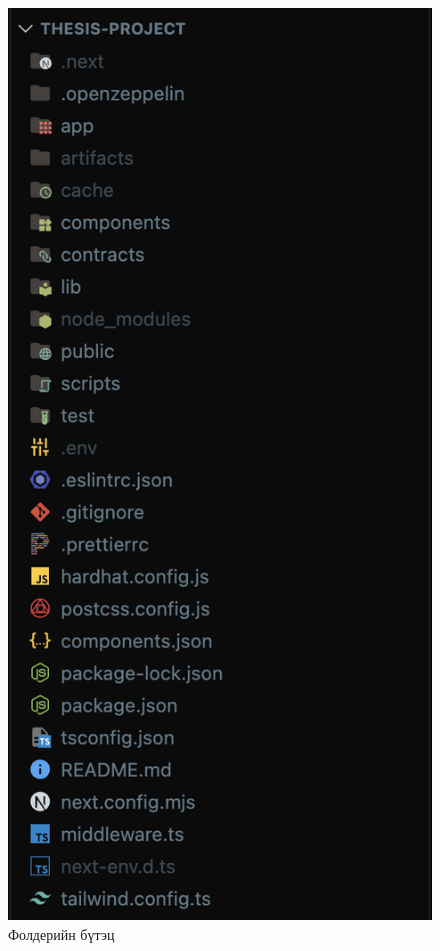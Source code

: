 \begin{figure}[h]
	\centering
	\includegraphics[scale=0.3]{src/images/folder-structure.png}
	\caption{Фолдерийн бүтэц}
\end{figure}

